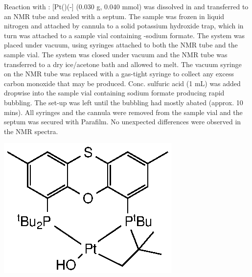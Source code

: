 Reaction with :
[Pt(\tButhixantphos)(-] (0.030 g, 0.040 mmol) was dissolved in  and transferred to an NMR tube and sealed with a septum.  The sample was frozen in liquid nitrogen and attached by cannula to a solid potassium hydroxide trap, which in turn was attached to a sample vial containing \carbon{}-sodium formate.  The system was placed under vacuum, using syringes attached to both the NMR tube and the sample vial.  The system was closed under vacuum and the NMR tube was transferred to a dry ice/acetone bath and allowed to melt.  The vacuum syringe on the NMR tube was replaced with a gas-tight syringe to collect any excess carbon monoxide that may be produced.  Conc. sulfuric acid (1 mL) was added dropwise into the sample vial containing sodium formate producing rapid bubbling.  The set-up was left until the bubbling had mostly abated (approx. 10 mins).  All syringes and the cannula were removed from the sample vial and the septum was secured with Parafilm.  No unexpected differences were observed in the NMR spectra.  

\begin{structure}[h]
\begin{center}
\includegraphics{../Structures/Metallated.eps}
\end{center}
\end{structure}


